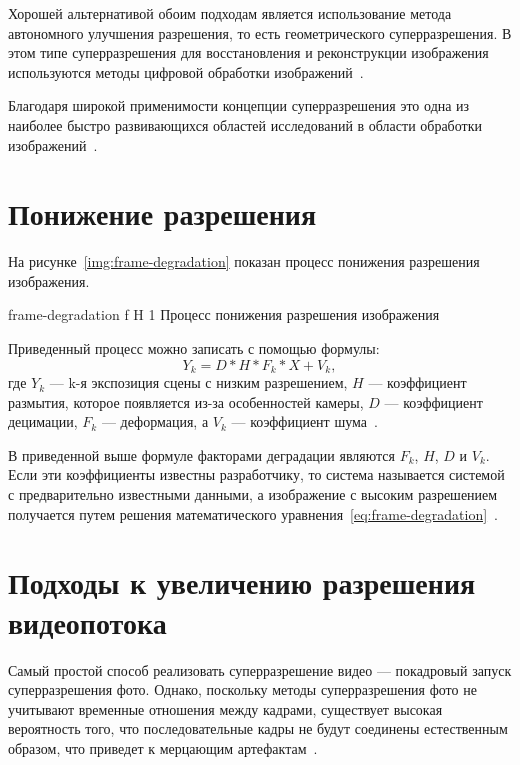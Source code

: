 \documentclass{bmstu}
\begin{document}
Хорошей альтернативой обоим подходам является использование метода автономного улучшения разрешения, то есть геометрического суперразрешения. В этом типе суперразрешения для восстановления и реконструкции изображения используются методы цифровой обработки изображений~\cite{Daithankar2021}.

Благодаря широкой применимости концепции суперразрешения это одна из наиболее быстро развивающихся областей исследований в области обработки изображений~\cite{Yue2016}.

\section{Понижение разрешения}

На рисунке~\ref{img:frame-degradation} показан процесс понижения разрешения изображения.

    {frame-degradation}
    {f}
    {H}
    {1\textwidth}
    {Процесс понижения разрешения изображения~\cite{Daithankar2021}}
    
Приведенный процесс можно записать с помощью формулы:
\begin{equation} 
\label{eq:frame-degradation}
Y_{k} = D * H * F_{k} * X + V_{k},
\end{equation}
где $Y_{k}$ --- k-я экспозиция сцены с низким разрешением, $H$ --- коэффициент размытия, которое появляется из-за особенностей камеры, $D$ --- коэффициент децимации, $F_{k}$ --- деформация, а $V_{k}$ --- коэффициент шума~\cite{Daithankar2021}.

В приведенной выше формуле факторами деградации являются $F_{k}$, $H$, $D$ и $V_{k}$. 
Если эти коэффициенты известны разработчику, то система называется системой с предварительно известными данными, а изображение с высоким разрешением получается путем решения математического уравнения~\ref{eq:frame-degradation}~\cite{Daithankar2021}.

\section{Подходы к увеличению разрешения видеопотока}

Самый простой способ реализовать суперразрешение видео --- покадровый запуск суперразрешения фото. 
Однако, поскольку методы суперразрешения фото не учитывают временные отношения между кадрами, существует высокая вероятность того, что последовательные кадры не будут соединены естественным образом, что приведет к мерцающим артефактам~\cite{Younghyun2018}.
\end{document}
